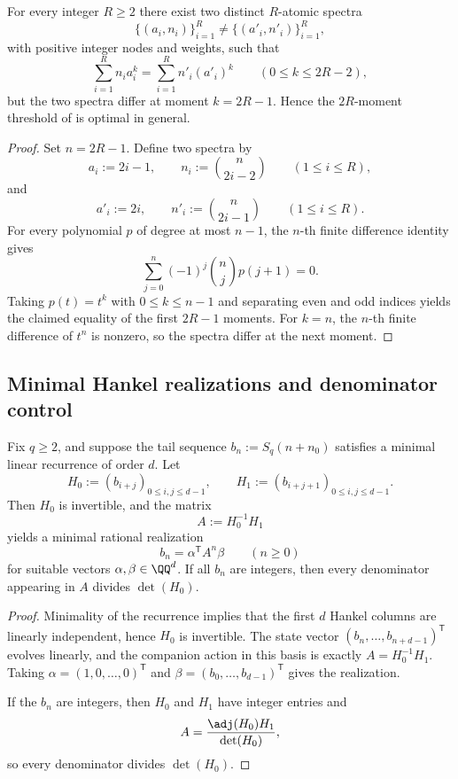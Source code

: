 \begin{theorem}
\label{thm:fiber-threshold-sharp}
For every integer \(R\ge 2\) there exist two distinct \(R\)-atomic spectra
\[
  \{(a_i,n_i)\}_{i=1}^R\neq \{(a'_i,n'_i)\}_{i=1}^R,
\]
with positive integer nodes and weights, such that
\[
  \sum_{i=1}^R n_i a_i^k
  =
  \sum_{i=1}^R n'_i (a'_i)^k
  \qquad (0\le k\le 2R-2),
\]
but the two spectra differ at moment \(k=2R-1\).  Hence the
\(2R\)-moment threshold of  is optimal in
general.
\end{theorem}

\begin{proof}
Set \(n=2R-1\).  Define two spectra by
\[
  a_i:=2i-1,
  \qquad
  n_i:=\binom{n}{2i-2}
  \qquad (1\le i\le R),
\]
and
\[
  a'_i:=2i,
  \qquad
  n'_i:=\binom{n}{2i-1}
  \qquad (1\le i\le R).
\]
For every polynomial \(p\) of degree at most \(n-1\), the \(n\)-th finite
difference identity gives
\[
  \sum_{j=0}^{n}(-1)^j\binom{n}{j}p(j+1)=0.
\]
Taking \(p(t)=t^k\) with \(0\le k\le n-1\) and separating even and odd indices
yields the claimed equality of the first \(2R-1\) moments.  For \(k=n\), the
\(n\)-th finite difference of \(t^n\) is nonzero, so the spectra differ at the
next moment.
\end{proof}

\subsection{Minimal Hankel realizations and denominator control}

\begin{proposition}
\label{prop:hankel-realization}
Fix \(q\ge 2\), and suppose the tail sequence \(b_n:=S_q(n+n_0)\) satisfies a
minimal linear recurrence of order \(d\).  Let
\[
  H_0:=(b_{i+j})_{0\le i,j\le d-1},
  \qquad
  H_1:=(b_{i+j+1})_{0\le i,j\le d-1}.
\]
Then \(H_0\) is invertible, and the matrix
\[
  A:=H_0^{-1}H_1
\]
yields a minimal rational realization
\[
  b_n=\alpha^{\mathsf T}A^n\beta
  \qquad (n\ge 0)
\]
for suitable vectors \(\alpha,\beta\in\QQ^d\).  If all \(b_n\) are integers,
then every denominator appearing in \(A\) divides \(\det(H_0)\).
\end{proposition}

\begin{proof}
Minimality of the recurrence implies that the first \(d\) Hankel columns are
linearly independent, hence \(H_0\) is invertible.  The state vector
\((b_n,\dots,b_{n+d-1})^{\mathsf T}\) evolves linearly, and the companion action
in this basis is exactly \(A=H_0^{-1}H_1\).  Taking
\(\alpha=(1,0,\dots,0)^{\mathsf T}\) and
\(\beta=(b_0,\dots,b_{d-1})^{\mathsf T}\) gives the realization.

If the \(b_n\) are integers, then \(H_0\) and \(H_1\) have integer entries and
\[
  A=\frac{\adj(H_0)H_1}{\det(H_0)},
\]
so every denominator divides \(\det(H_0)\).
\end{proof}

